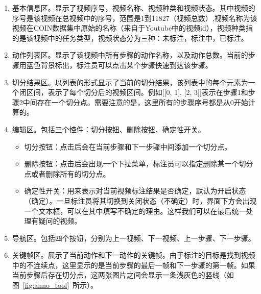 \begin{enumerate}
    \item 基本信息区。显示了视频序号，视频名称、视频种类和视频状态。其中视频的序号是该视频在总视频中的序号，范围是1到11827（视频总数）,视频名称为该视频在COIN数据集中原始的名称（来自于Youtube中的视频id），视频种类指的是该视频中的任务类型，视频状态分为三种：未标注，标注中，已标注。
    \item 动作列表区。显示了该视频中所有步骤的动作名称，以及动作总数。当前的步骤用蓝色背景标出，标注员可以点击某个步骤快速到达该步骤。
    \item 切分结果区。以列表的形式显示了当前的切分结果，该列表中的每个元素为一个闭区间，表示了每个切分后的视频区间。例如[[0, 1], [2, 3]]表示在步骤1和步骤2中间存在一个切分点。需要注意的是，这里所有的步骤序号都是从0开始计算的。
    \item 编辑区。包括三个控件：切分按钮、删除按钮、确定性开关。
    \begin{itemize}
        \item 切分按钮：点击后会在当前步骤和下一步骤中间添加一个切分点。
        \item 删除按钮：点击后会出现一个下拉菜单，标注员可以指定删除某一个切分点或者删除所有的切分点。
        \item 确定性开关：用来表示对当前视频标注结果是否确定，默认为开启状态（确定）。一旦标注员将其切换到关闭状态（不确定）时，界面下方会出现一个文本框，可以在其中填写不确定的理由。这样我们可以在最后统一处理有疑问的视频。
    \end{itemize}
    \item 导航区。包括四个按钮，分别为上一视频、下一视频、上一步骤、下一步骤。
    \item 关键帧区。展示了当前动作和下一动作的关键帧。由于标注的目标是找到视频中的不连续点，这里显示的是当前步骤的最后一帧和下一步骤的第一帧。如果当前步骤后存在切分点，这两张图片之间会显示一条浅灰色的竖线（如图~\ref{fig:anno_tool}~所示）。
    
\end{enumerate}



